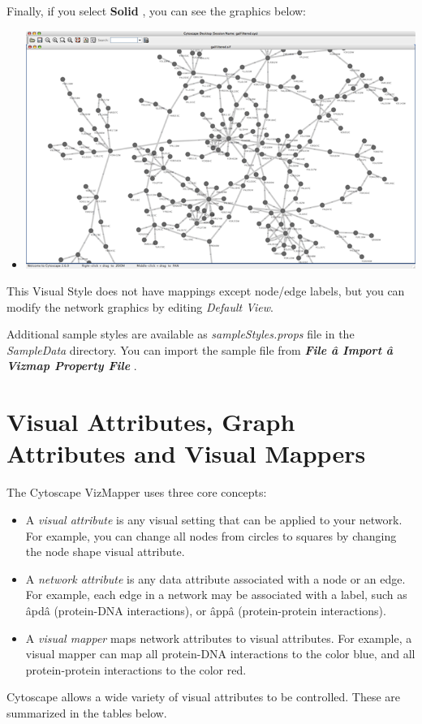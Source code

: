 \begin{enumerate}
 Finally, if you select \textbf{Solid} , you can see the graphics below: 
\begin{itemize}
\item \includegraphics[width=.6\textwidth]{images/VizMapperSolidStyle.png} 
\end{itemize}
\end{enumerate}
 This Visual Style does not have mappings except node/edge labels, but you can modify the network graphics by editing \emph{Default View}. 

 Additional sample styles are available as \emph{sampleStyles.props} file in the \emph{SampleData} directory. You can import the sample file from \emph{\textbf{File \^a Import \^a Vizmap Property File} }. 
 
\section{Visual Attributes, Graph Attributes and Visual Mappers}
 The Cytoscape VizMapper uses three core concepts: 
\begin{itemize}
\item A \emph{visual attribute} is any visual setting that can be applied to your network. For example, you can change all nodes from circles to squares by changing the node shape visual attribute. 
\item A \emph{network attribute} is any data attribute associated with a node or an edge. For example, each edge in a network may be associated with a label, such as \^apd\^a (protein-DNA interactions), or \^app\^a (protein-protein interactions). 

\item A \emph{visual mapper} maps network attributes to visual attributes. For example, a visual mapper can map all protein-DNA interactions to the color blue, and all protein-protein interactions to the color red. 
\end{itemize}
Cytoscape allows a wide variety of visual attributes to be controlled. These are summarized in the tables below. 

